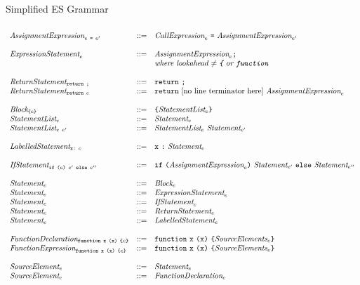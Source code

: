 \documentclass[preprint,10pt]{sigplanconf}
\begin{document}
\begin{displayfigure*}{\label{fig:grammar}Simplified ES Grammar}
\[\begin{array}{lcl}
  \\
  \textit{AssignmentExpression}_{e~\texttt{=}~e'} &::=&
  \textit{CallExpression}_{e}~\texttt{=}~
  \textit{AssignmentExpression}_{e'}
  \\ \\
  \textit{ExpressionStatement}_{e} &::=&
  \textit{AssignmentExpression}_{e} \texttt{;}
  \\ 
  &&  \textit{where lookahead \( \not =
    \texttt{\{} \) or \( \texttt{function} \)}
  \\ \\
  \textit{ReturnStatement}_{\texttt{return}~\texttt{;}} &::=&
  \texttt{return}~\texttt{;}
  \\
  \textit{ReturnStatement}_{\texttt{return}~e} &::=&
  \texttt{return}~\textrm{[no line terminator here]}~\textit{AssignmentExpression}_{e}
  \\ \\
  \textit{Block}_{\texttt{\{}e\texttt{\}}} &::=&
  \texttt{\{} \textit{StatementList}_{e} \texttt{\}} 
  \\
  \textit{StatementList}_{e} &::=&
  \textit{Statement}_{e}
  \\
  \textit{StatementList}_{e~e'} &::=&
  \textit{StatementList}_{e}~
  \textit{Statement}_{e'}
  \\ \\
  \textit{LabelledStatement}_{\texttt{x}\texttt{:}~e} &::=&
  \texttt{x}~\texttt{:}~\textit{Statement}_{e}
  \\ \\
  \textit{IfStatement}_{\texttt{if}~\texttt{(}e\texttt{)}~e'~\texttt{else}~e''} &::=&
  \texttt{if}~\texttt{(}\textit{AssignmentExpression}_{e}\texttt{)}~\textit{Statement}_{e'}~
  \texttt{else}~\textit{Statement}_{e''}
  \\ \\
  \textit{Statement}_{e} &::=& \textit{Block}_{e}
  \\
  \textit{Statement}_{e} &::=& \textit{ExpressionStatement}_{e}
  \\
  \textit{Statement}_{e} &::=& \textit{IfStatement}_{e}
  \\
  \textit{Statement}_{e} &::=& \textit{ReturnStatement}_{e}
  \\
  \textit{Statement}_{e} &::=& \textit{LabelledStatement}_{e}
  \\ \\
  \textit{FunctionDeclaration}_{\texttt{function}~\texttt{x}~\texttt{(}\texttt{x}\texttt{)}~\texttt{\{}e\texttt{\}}} 
  &::=&
  \texttt{function}~\texttt{x}~\texttt{(}\texttt{x}\texttt{)}~
  \texttt{\{}\textit{SourceElements}_{e}\texttt{\}}
  \\
  \textit{FunctionExpression}_{\texttt{function}~\texttt{x}~\texttt{(}\texttt{x}\texttt{)}~\texttt{\{}e\texttt{\}}} 
  &::=&
  \texttt{function}~\texttt{x}~\texttt{(}\texttt{x}\texttt{)}~
  \texttt{\{}\textit{SourceElements}_{e}\texttt{\}}
  \\ \\
  \textit{SourceElement}_{e} &::=& \textit{Statement}_{e} 
  \\
  \textit{SourceElement}_{e} &::=& \textit{FunctionDeclaration}_{e}
  \\ \\


\end{array}\]
\end{displayfigure*}
\end{document}
